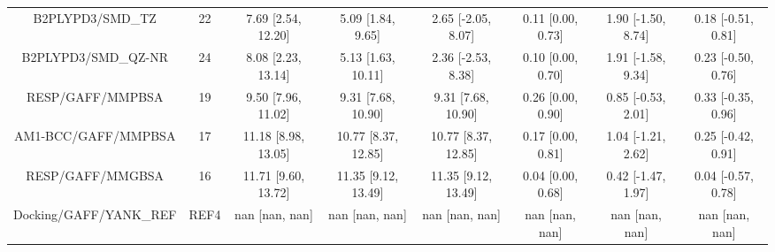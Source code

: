 \documentclass[8pt]{article}
\begin{document}
\begin{center}
\begin{footnotesize}
\begin{longtable}{|cccccccc|}
                   B2PLYPD3/SMD\_TZ &    22 &   7.69 [2.54, 12.20] &    5.09 [1.84, 9.65] &    2.65 [-2.05, 8.07] &  0.11 [0.00, 0.73] &  1.90 [-1.50, 8.74] &  0.18 [-0.51, 0.81] \\
                B2PLYPD3/SMD\_QZ-NR &    24 &   8.08 [2.23, 13.14] &   5.13 [1.63, 10.11] &    2.36 [-2.53, 8.38] &  0.10 [0.00, 0.70] &  1.91 [-1.58, 9.34] &  0.23 [-0.50, 0.76] \\
                   RESP/GAFF/MMPBSA &    19 &   9.50 [7.96, 11.02] &   9.31 [7.68, 10.90] &    9.31 [7.68, 10.90] &  0.26 [0.00, 0.90] &  0.85 [-0.53, 2.01] &  0.33 [-0.35, 0.96] \\
                AM1-BCC/GAFF/MMPBSA &    17 &  11.18 [8.98, 13.05] &  10.77 [8.37, 12.85] &   10.77 [8.37, 12.85] &  0.17 [0.00, 0.81] &  1.04 [-1.21, 2.62] &  0.25 [-0.42, 0.91] \\
                   RESP/GAFF/MMGBSA &    16 &  11.71 [9.60, 13.72] &  11.35 [9.12, 13.49] &   11.35 [9.12, 13.49] &  0.04 [0.00, 0.68] &  0.42 [-1.47, 1.97] &  0.04 [-0.57, 0.78] \\
             Docking/GAFF/YANK\_REF &  REF4 &       nan [nan, nan] &       nan [nan, nan] &        nan [nan, nan] &     nan [nan, nan] &      nan [nan, nan] &      nan [nan, nan] \\
\end{longtable}
\end{footnotesize}
\end{center}
\end{document}
